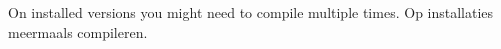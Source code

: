 \documentclass[presentatie.tex]{subfiles}
\begin{document}
\lang
{
    \section{\texorpdfstring{}{Good to know}}
}
{
    \section{\texorpdfstring{}{Goed om te weten}}
}

\clearrecentlist


\begin{frame}
    \lang
    {On installed versions you might need to compile multiple times.}
    {Op installaties meermaals compileren.}
\end{frame}

\end{document}
